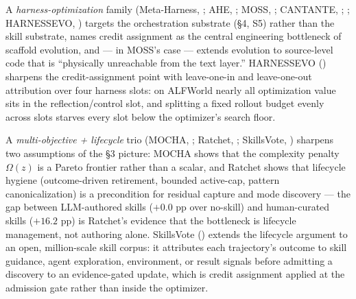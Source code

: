 \documentclass[
]{article}
\begin{document}
A \emph{harness-optimization} family (Meta-Harness,
; AHE,
; MOSS,
; CANTANTE,
;
; HARNESSEVO,
) targets the
orchestration substrate (§4, S5) rather than the skill substrate, names
credit assignment as the central engineering bottleneck of scaffold
evolution, and --- in MOSS's case --- extends evolution to source-level
code that is ``physically unreachable from the text layer.'' HARNESSEVO
() sharpens the
credit-assignment point with leave-one-in and leave-one-out attribution
over four harness slots: on ALFWorld nearly all optimization value sits
in the reflection/control slot, and splitting a fixed rollout budget
evenly across slots starves every slot below the optimizer's search
floor.

A \emph{multi-objective + lifecycle} trio (MOCHA,
; Ratchet,
; SkillsVote,
) sharpens two
assumptions of the §3 picture: MOCHA shows that the complexity penalty
\(\Omega(z)\) is a Pareto frontier rather than a scalar, and Ratchet
shows that lifecycle hygiene (outcome-driven retirement, bounded
active-cap, pattern canonicalization) is a precondition for residual
capture and mode discovery --- the gap between LLM-authored skills
(\(+0.0\) pp over no-skill) and human-curated skills (\(+16.2\) pp) is
Ratchet's evidence that the bottleneck is lifecycle management, not
authoring alone. SkillsVote () extends the lifecycle argument to an open, million-scale
skill corpus: it attributes each trajectory's outcome to skill guidance,
agent exploration, environment, or result signals before admitting a
discovery to an evidence-gated update, which is credit assignment
applied at the admission gate rather than inside the optimizer.
\end{document}
